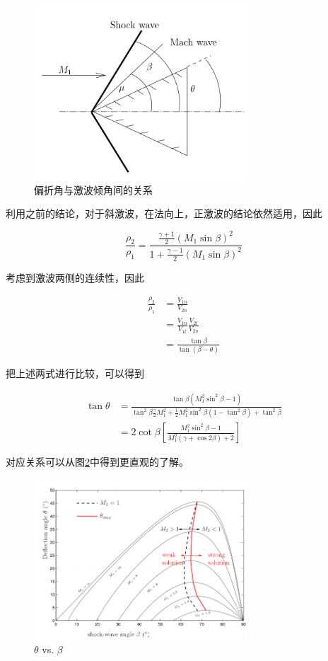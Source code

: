 \begin{figure}[!ht]
    \centering
    \includegraphics[width=8cm]{figures/7.png}
    \caption{偏折角与激波倾角间的关系}
    \label{7}
\end{figure}

利用之前的结论，对于斜激波，在法向上，正激波的结论依然适用，因此

\begin{equation*}
    \frac{\rho_{2}}{\rho_{1}}=\frac{\frac{\gamma+1}{2}\left(M_{1} \sin \beta\right)^{2}}{1+\frac{\gamma-1}{2}\left(M_{1} \sin \beta\right)^{2}}
\end{equation*}

考虑到激波两侧的连续性，因此

\begin{align*}
    \frac{\rho_{2}}{\rho_{1}}&=\frac{V_{1 n}}{V_{2 n}}\\ 
    &=\frac{V_{1 n}}{V_{1 t}} \frac{V_{2 t}}{V_{2 n}}\\ 
    &=\frac{\tan \beta}{\tan (\beta-\theta)}
\end{align*}

把上述两式进行比较，可以得到

\begin{align*}
    \tan \theta&=\frac{\tan \beta\left(M_{1}^{2} \sin ^{2} \beta-1\right)}{\tan ^{2} \beta \frac{\gamma}{2} M_{1}^{2}+\frac{1}{2} M_{1}^{2} \sin ^{2} \beta\left(1-\tan ^{2} \beta\right)+\tan ^{2} \beta}\\ 
    &=2 \cot \beta\left[\frac{M_{1}^{2} \sin ^{2} \beta-1}{M_{1}^{2}(\gamma+\cos 2 \beta)+2}\right]
\end{align*}

对应关系可以从图\ref{8}中得到更直观的了解。

\begin{figure}[!ht]
    \centering
    \includegraphics[width=8cm]{figures/8.png}
    \caption{$\theta$ vs. $\beta$}
    \label{8}
\end{figure}

